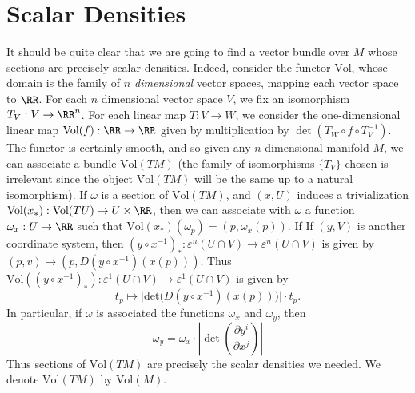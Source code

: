 \section{Scalar Densities}

It should be quite clear that we are going to find a vector bundle over $M$ whose sections are precisely scalar densities. Indeed, consider the functor $\text{Vol}$, whose domain is the family of \emph{$n$ dimensional} vector spaces, mapping each vector space to $\RR$. For each $n$ dimensional vector space $V$, we fix an isomorphism $T_V: V \to \RR^n$.  For each linear map $T: V \to W$, we consider the one-dimensional linear map $\text{Vol}(f): \RR \to \RR$ given by multiplication by $\det(T_W \circ f \circ T_V^{-1})$. The functor is certainly smooth, and so given any $n$ dimensional manifold $M$, we can associate a bundle $\text{Vol}(TM)$ (the family of isomorphisms $\{ T_V \}$ chosen is irrelevant since the object $\text{Vol}(TM)$ will be the same up to a natural isomorphism). If $\omega$ is a section of $\text{Vol}(TM)$, and $(x,U)$ induces a trivialization $\text{Vol}(x_*): \text{Vol}(TU) \to U \times \RR$, then we can associate with $\omega$ a function $\omega_x: U \to \RR$ such that $\text{Vol}(x_*)(\omega_p) = (p, \omega_x(p))$. If If $(y,V)$ is another coordinate system, then $(y \circ x^{-1})_*: \varepsilon^n(U \cap V) \to \varepsilon^n(U \cap V)$ is given by $(p,v) \mapsto (p, D(y \circ x^{-1})(x(p)))$. Thus $\text{Vol}((y \circ x^{-1})_*): \varepsilon^1(U \cap V) \to \varepsilon^1(U \cap V)$ is given by
%
\[ t_p \mapsto \Big| \text{det} \big( D(y \circ x^{-1})(x(p)) \big) \Big| \cdot t_p. \]
%
In particular, if $\omega$ is associated the functions $\omega_x$ and $\omega_y$, then
%
\[ \omega_y = \omega_x \cdot \left| \det \left( \frac{\partial y^i}{\partial x^j} \right) \right| \]
%
Thus sections of $\text{Vol}(TM)$ are precisely the scalar densities we needed. We denote $\text{Vol}(TM)$ by $\text{Vol}(M)$.

